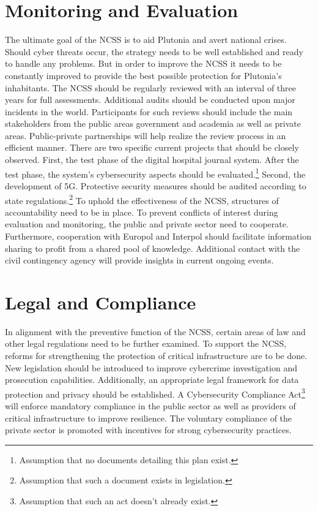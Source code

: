 \documentclass[
	a4paper, %
	10pt, %
]{CSSullivanBusinessReport}
\begin{document}
\begin{fullwidth}
\begin{justify}
\section{Monitoring and Evaluation}
The ultimate goal of the NCSS is to aid Plutonia and avert national crises. Should cyber threats occur, the strategy needs to be well established and ready to handle any problems. But in order to improve the NCSS it needs to be constantly improved to provide the best possible protection for Plutonia's inhabitants. The NCSS should be regularly reviewed with an interval of three years for full assessments. Additional audits should be conducted upon major incidents in the world. Participants for such reviews should include the main stakeholders from the public areas government and academia as well as private areas. Public-private partnerships will help realize the review process in an efficient manner. There are two specific current projects that should be closely observed. First, the test phase of the digital hospital journal system. After the test phase, the system’s cybersecurity aspects should be evaluated.\footnote{Assumption that no documents detailing this plan exist. } Second, the development of 5G. Protective security measures should be audited according to state regulations.\footnote{Assumption that such a document exists in legislation.} To uphold the effectiveness of the NCSS, structures of accountability need to be in place. To prevent conflicts of interest during evaluation and monitoring, the public and private sector need to cooperate. Furthermore, cooperation with Europol and Interpol should facilitate information sharing to profit from a shared pool of knowledge. Additional contact with the civil contingency agency will provide insights in current ongoing events.


\section{Legal and Compliance}
In alignment with the preventive function of the NCSS, certain areas of law and other legal regulations need to be further examined. To support the NCSS, reforms for strengthening the protection of critical infrastructure are to be done. New legislation should be introduced to improve cybercrime investigation and prosecution capabilities. Additionally, an appropriate legal framework for data protection and privacy should be established. A Cybersecurity Compliance Act\footnote{Assumption that such an act doesn’t already exist.} will enforce mandatory compliance in the public sector as well as providers of critical infrastructure to improve resilience. The voluntary compliance of the private sector is promoted with incentives for strong cybersecurity practices.


\end{justify}
\end{fullwidth}
\end{document}
